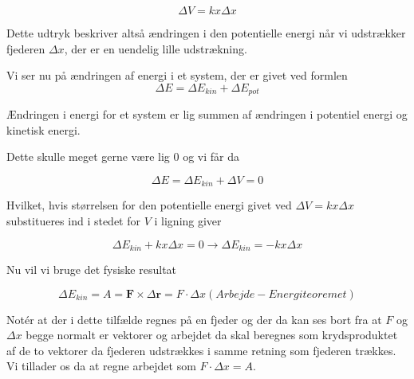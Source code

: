 \begin{equation}
\Delta V = kx \Delta x
\end{equation} 

\bigskip

Dette udtryk beskriver altså ændringen i den potentielle energi når vi udstrækker fjederen $\Delta x$, der er en uendelig lille udstrækning. 

\bigskip

Vi ser nu på ændringen af energi i et system, der er givet ved formlen 
\begin{equation}
\Delta E = \Delta E_{kin} + \Delta E_{pot}
\end{equation}

\bigskip

Ændringen i energi for et system er lig summen af ændringen i potentiel energi og kinetisk energi. 

Dette skulle meget gerne være lig 0 og vi får da 

\bigskip

\begin{equation}
\Delta E = \Delta E_{kin} + \Delta V = 0
\end{equation}

\bigskip

Hvilket, hvis størrelsen for den potentielle energi givet ved $\Delta V = kx \Delta x$ substitueres ind i stedet for $V$ i ligning  giver

\bigskip

\begin{equation}
\Delta E_{kin} + kx \Delta x = 0 \rightarrow \Delta E_{kin} = -kx \Delta x
\end{equation}

\bigskip

Nu vil vi bruge det fysiske resultat

\bigskip

\begin{equation}
\Delta E_{kin} = A = \textbf{F} \times \Delta \textbf{r} = F \cdot \Delta x (Arbejde-Energi teoremet)
\end{equation}

\bigskip

Notér at der i dette tilfælde regnes på en fjeder og der da kan ses bort fra at $F$ og $\Delta x$ begge normalt er vektorer og arbejdet da skal beregnes som krydsproduktet af de to vektorer da fjederen udstrækkes i samme retning som fjederen trækkes. Vi tillader os da at regne arbejdet som $F \cdot \Delta x = A$.


